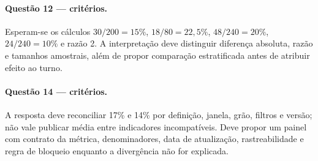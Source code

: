 \paragraph{Questão 12 --- critérios.} Esperam-se os cálculos $30/200=15\%$, $18/80=22{,}5\%$, $48/240=20\%$, $24/240=10\%$ e razão 2. A interpretação deve distinguir diferença absoluta, razão e tamanhos amostrais, além de propor comparação estratificada antes de atribuir efeito ao turno.

\paragraph{Questão 14 --- critérios.} A resposta deve reconciliar 17\% e 14\% por definição, janela, grão, filtros e versão; não vale publicar média entre indicadores incompatíveis. Deve propor um painel com contrato da métrica, denominadores, data de atualização, rastreabilidade e regra de bloqueio enquanto a divergência não for explicada.
